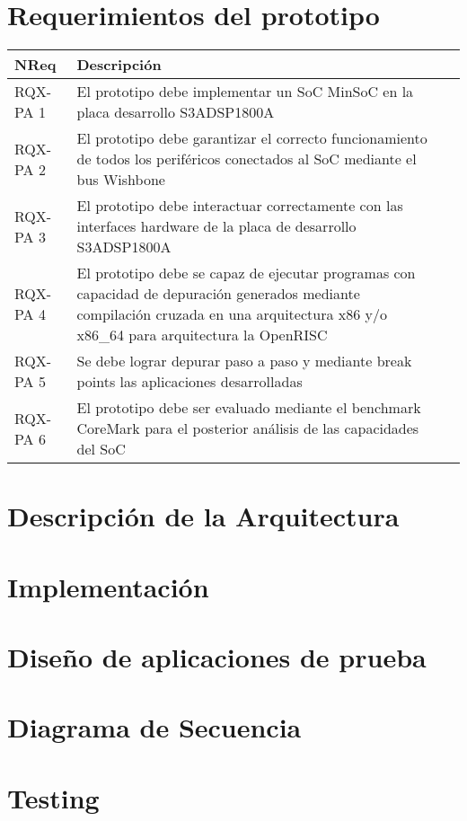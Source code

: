 		\section{Requerimientos del prototipo}
		\begin{tabular}{ p{2.5cm} p{8cm} p{3cm} }
		\hline 
		\rowcolor[gray]{0.8} N\textordmasculine Req & Descripción\\
		\hline 
		RQX-PA 1 & El prototipo debe implementar un SoC MinSoC en la placa desarrollo S3ADSP1800A\\ 
		\hline 
		RQX-PA 2 & El prototipo debe garantizar el correcto funcionamiento de todos los periféricos conectados al SoC mediante el bus Wishbone\\ 
		\hline 
		RQX-PA 3 & El prototipo debe interactuar correctamente con las interfaces hardware de la placa de desarrollo S3ADSP1800A\\ 
		\hline
		RQX-PA 4 & El prototipo debe se capaz de ejecutar programas con capacidad de depuración generados mediante compilación
		cruzada en una arquitectura x86 y/o x86\_64 para arquitectura la OpenRISC\\
		\hline
		RQX-PA 5 & Se debe lograr depurar paso a paso y mediante break points las aplicaciones desarrolladas\\
		\hline
		RQX-PA 6 & El prototipo debe ser evaluado mediante el benchmark CoreMark para el posterior análisis de las capacidades del SoC\\
		\hline		
		\end{tabular}
		
		\section{Descripción de la Arquitectura}
		
			
		\section{Implementación}
		
		\section{Diseño de aplicaciones de prueba}
		
		\section{Diagrama de Secuencia}
		
		\section{Testing}
		
